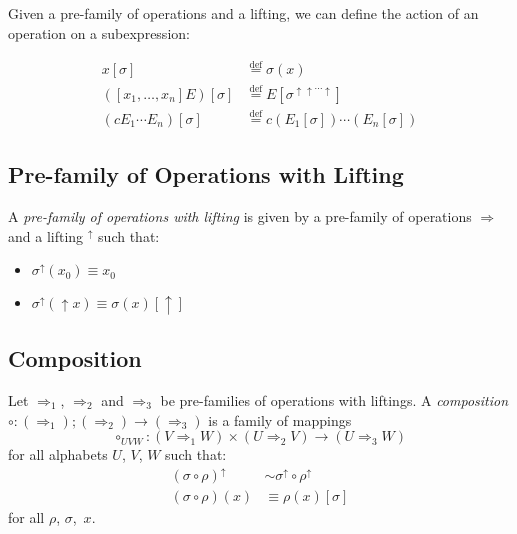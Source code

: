 \documentclass[envcountsame]{llncs}
\newcommand{\eqdef}{\ensuremath{\stackrel{\mathrm{def}}{=}}}
\begin{document}

Given a pre-family of operations and a lifting, we can define the action of an operation on a subexpression:

\begin{eqnarray*}
 x [ \sigma ] & \eqdef \sigma(x) \\
 ([x_1, \ldots, x_n] E) [ \sigma ] & \eqdef E [ \sigma^{\uparrow \uparrow \cdots \uparrow} ] \\
 (c E_1 \cdots E_n) [ \sigma ] & \eqdef c (E_1 [ \sigma ]) \cdots (E_n [ \sigma ])
\end{eqnarray*}


\subsection{Pre-family of Operations with Lifting}

\begin{definition}
 A \emph{pre-family of operations with lifting} is given by a pre-family of operations $\Rightarrow$ and a lifting $^\uparrow$ such that:
 \begin{itemize}
  \item $\sigma^\uparrow(x_0) \equiv x_0$
  \item $\sigma^\uparrow(\uparrow x) \equiv \sigma(x) [ \uparrow ]$
 \end{itemize}
\end{definition}


\subsection{Composition}

\begin{definition}[Composition]
 Let $\Rightarrow_1$, $\Rightarrow_2$ and $\Rightarrow_3$ be pre-families of operations with liftings.  A \emph{composition} $\circ : (\Rightarrow_1) ; (\Rightarrow_2) \rightarrow (\Rightarrow_3)$
 is a family of mappings
 \[ \circ_{UVW} : (V \Rightarrow_1 W) \times (U \Rightarrow_2 V) \rightarrow (U \Rightarrow_3 W) \]
 for all alphabets $U$, $V$, $W$ such that:
 \begin{align*}
  (\sigma \circ \rho)^\uparrow & \sim \sigma^\uparrow \circ \rho^\uparrow \\
  (\sigma \circ \rho)(x) & \equiv \rho(x) [ \sigma ]
 \end{align*}
for all $\rho$, $\sigma$, $x$.
\end{definition}
\end{document}
